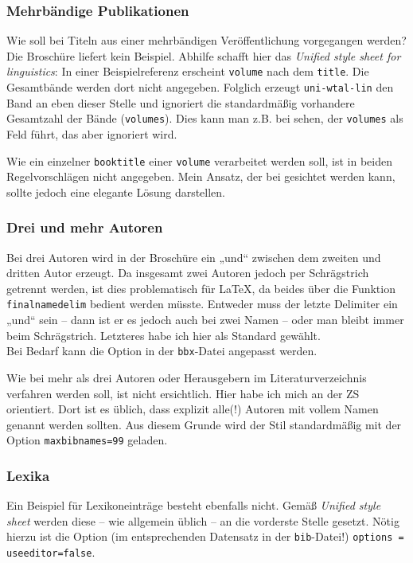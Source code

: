 \documentclass[12pt,notitlepage,parskip]{scrartcl}
\begin{document}
\subsubsection{Mehrbändige Publikationen}
Wie soll bei Titeln aus einer mehrbändigen Veröffentlichung vorgegangen
werden? Die Broschüre liefert kein Beispiel. Abhilfe schafft hier das
\textit{Unified style sheet for linguistics}: In einer Beispielreferenz
erscheint \texttt{volume} nach dem \texttt{title}. Die Gesamtbände werden
dort nicht angegeben.
Folglich erzeugt \texttt{uni-wtal-lin} den Band an eben dieser Stelle und
ignoriert die standardmäßig vorhandere Gesamtzahl der Bände (\texttt{volumes}).
Dies kann man z.B. bei \textcite{sterne1} sehen, der \texttt{volumes} als Feld
führt, das aber ignoriert wird.

Wie ein einzelner \texttt{booktitle} einer \texttt{volume} verarbeitet werden
soll, ist in beiden Regelvorschlägen nicht angegeben. Mein Ansatz, der bei
\textcite{unselbst-sammel-ders} gesichtet werden kann, sollte jedoch eine
elegante Lösung darstellen.

\subsubsection{Drei und mehr Autoren}
Bei drei Autoren wird in der Broschüre ein „und“ zwischen dem zweiten und
dritten Autor erzeugt. Da insgesamt zwei Autoren jedoch per Schrägstrich
getrennt werden, ist dies problematisch für \LaTeX, da beides über die Funktion
\texttt{finalnamedelim} bedient werden müsste. Entweder muss der letzte
Delimiter ein „und“ sein – dann ist er es jedoch auch bei zwei Namen – oder man
bleibt immer beim Schrägstrich. Letzteres habe ich hier als Standard gewählt.\\
Bei Bedarf kann die Option in der \texttt{bbx}-Datei angepasst werden.

Wie bei mehr als drei Autoren oder Herausgebern im Literaturverzeichnis
verfahren werden soll, ist nicht ersichtlich. Hier habe ich mich an der ZS
orientiert. Dort ist es üblich, dass explizit alle(!) Autoren mit vollem Namen
genannt werden sollten. Aus diesem Grunde wird der Stil standardmäßig mit der
Option \texttt{maxbibnames=99} geladen.

\subsubsection{Lexika}
Ein Beispiel für Lexikoneinträge besteht ebenfalls nicht. Gemäß
\textit{Unified style sheet} werden diese – wie allgemein üblich – an die
vorderste Stelle gesetzt. Nötig hierzu ist die Option (im entsprechenden
Datensatz in der \texttt{bib}-Datei!) \texttt{options = {useeditor=false}}.
\end{document}
